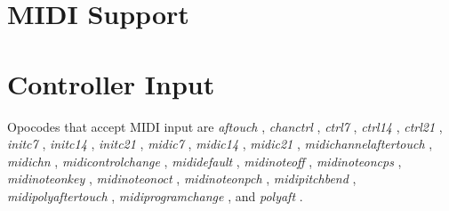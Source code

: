 \begin{comment}
\documentclass[10pt]{article}
\usepackage{fullpage, graphicx, url}
\setlength{\parskip}{1ex}
\setlength{\parindent}{0ex}
\title{MIDI Support}



\begin{tabular}{ccc}
The Alternative Csound Reference Manual & & \\
Previous & &Next

\end{tabular}

\end{comment}
\section{MIDI Support}
\section{Controller Input}


  Opocodes that accept MIDI input are \emph{aftouch}
, \emph{chanctrl}
, \emph{ctrl7}
, \emph{ctrl14}
, \emph{ctrl21}
, \emph{initc7}
, \emph{initc14}
, \emph{initc21}
, \emph{midic7}
, \emph{midic14}
, \emph{midic21}
, \emph{midichannelaftertouch}
, \emph{midichn}
, \emph{midicontrolchange}
, \emph{mididefault}
, \emph{midinoteoff}
, \emph{midinoteoncps}
, \emph{midinoteonkey}
, \emph{midinoteonoct}
, \emph{midinoteonpch}
, \emph{midipitchbend}
, \emph{midipolyaftertouch}
, \emph{midiprogramchange}
, and \emph{polyaft}
. 


\begin{comment}
\begin{tabular}{lcr}
Previous &Home &Next \\
Trigonometric Functions &Up &Converters

\end{tabular}



\end{comment}
